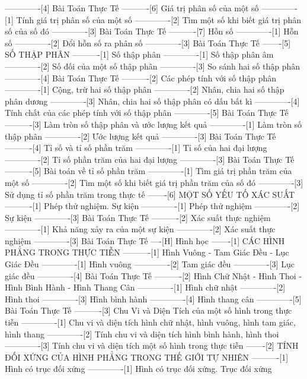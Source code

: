 -------------[4] Bài Toán Thực Tế
----------[6] Giá trị phân số của một số
-------------[1] Tính giá trị phân số của một số
-------------[2] Tìm một số khi biết giá trị phân số của số đó
-------------[3] Bài Toán Thực Tế
----------[7] Hỗn số
-------------[1] Hỗn số
-------------[2] Đổi hỗn số ra phân số
-------------[3] Bài Toán Thực Tế
-------[5] SỐ THẬP PHÂN
----------[1] Số thập phân
-------------[1] Số thập phân âm
-------------[2] Số đối của một số thập phân
-------------[3] So sánh hai số thập phân
-------------[4] Bài Toán Thực Tế
----------[2] Các phép tính với số thập phân
-------------[1] Cộng, trừ hai số thập phân
-------------[2] Nhân, chia hai số thập phân dương
-------------[3] Nhân, chia hai số thập phân có dấu bất kì
-------------[4] Tính chất của các phép tính với số thập phân
-------------[5] Bài Toán Thực Tế
----------[3] Làm tròn số thập phân và ước lượng kết quả
-------------[1] Làm tròn số thập phân
-------------[2] Ước lượng kết quả
-------------[3] Bài Toán Thực Tế
----------[4] Tỉ số và tỉ số phần trăm
-------------[1] Tỉ số của hai đại lượng
-------------[2] Tỉ số phần trăm của hai đại lượng
-------------[3] Bài Toán Thực Tế
----------[5] Bài toán về tỉ số phần trăm
-------------[1] Tìm giá trị phần trăm của một số
-------------[2] Tìm một số khi biết giá trị phần trăm của số đó
-------------[3] Sử dụng tỉ số phần trăm trong thực tế
-------[6] MỘT SỐ YẾU TỐ XÁC SUẤT
----------[1] Phép thử nghiệm. Sự kiện
-------------[1] Phép thử nghiệm
-------------[2] Sự kiện
-------------[3] Bài Toán Thực Tế
----------[2] Xác suất thực nghiệm
-------------[1] Khả năng xảy ra của một sự kiện
-------------[2] Xác suất thực nghiệm
-------------[3] Bài Toán Thực Tế
----[H] Hình học
-------[1] CÁC HÌNH PHẲNG TRONG THỰC TIỄN
----------[1] Hình Vuông - Tam Giác Đều - Lục Giác Đều
-------------[1] Hình vuông
-------------[2] Tam giác đều
-------------[3] Lục giác đều
-------------[4] Bài Toán Thực Tế
----------[2] Hình Chữ Nhật - Hình Thoi - Hình Bình Hành - Hình Thang Cân
-------------[1] Hình chữ nhật
-------------[2] Hình thoi
-------------[3] Hình bình hành
-------------[4] Hình thang cân
-------------[5] Bài Toán Thực Tế
----------[3] Chu Vi và Diện Tích của một số hình trong thực tiễn
-------------[1] Chu vi và diện tích hình chữ nhật, hình vuông, hình tam giác, hình thang
-------------[2] Tính chu vi và diện tích hình bình hành, hình thoi
-------------[3] Tính chu vi và diện tích một số hình trong thực tiễn
-------[2] TÍNH ĐỐI XỨNG CỦA HÌNH PHẲNG TRONG THẾ GIỚI TỰ NHIÊN
----------[1] Hình có trục đối xứng
-------------[1] Hình có trục đối xứng. Trục đối xứng

